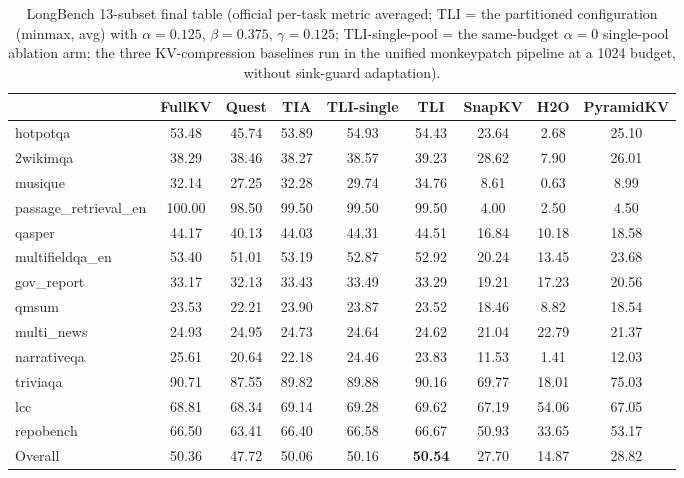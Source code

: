 \documentclass[11pt]{article}
\begin{document}
\begin{table}[h]\centering
\small
\caption{LongBench 13-subset final table (official per-task metric averaged; TLI = the partitioned configuration (minmax, avg) with $\alpha{=}0.125$, $\beta{=}0.375$, $\gamma{=}0.125$; TLI-single-pool = the same-budget $\alpha{=}0$ single-pool ablation arm; the three KV-compression baselines run in the unified monkeypatch pipeline at a 1024 budget, without sink-guard adaptation).}
\label{tab:longbench}
\begin{tabular}{lcccccccc}
\toprule
 & FullKV & Quest & TIA & TLI-single & TLI & SnapKV & H2O & PyramidKV \\

\midrule
hotpotqa & 53.48 & 45.74 & 53.89 & 54.93 & 54.43 & 23.64 & 2.68 & 25.10 \\
2wikimqa & 38.29 & 38.46 & 38.27 & 38.57 & 39.23 & 28.62 & 7.90 & 26.01 \\
musique & 32.14 & 27.25 & 32.28 & 29.74 & 34.76 & 8.61 & 0.63 & 8.99 \\
passage\_retrieval\_en & 100.00 & 98.50 & 99.50 & 99.50 & 99.50 & 4.00 & 2.50 & 4.50 \\
qasper & 44.17 & 40.13 & 44.03 & 44.31 & 44.51 & 16.84 & 10.18 & 18.58 \\
multifieldqa\_en & 53.40 & 51.01 & 53.19 & 52.87 & 52.92 & 20.24 & 13.45 & 23.68 \\
gov\_report & 33.17 & 32.13 & 33.43 & 33.49 & 33.29 & 19.21 & 17.23 & 20.56 \\
qmsum & 23.53 & 22.21 & 23.90 & 23.87 & 23.52 & 18.46 & 8.82 & 18.54 \\
multi\_news & 24.93 & 24.95 & 24.73 & 24.64 & 24.62 & 21.04 & 22.79 & 21.37 \\
narrativeqa & 25.61 & 20.64 & 22.18 & 24.46 & 23.83 & 11.53 & 1.41 & 12.03 \\
triviaqa & 90.71 & 87.55 & 89.82 & 89.88 & 90.16 & 69.77 & 18.01 & 75.03 \\
lcc & 68.81 & 68.34 & 69.14 & 69.28 & 69.62 & 67.19 & 54.06 & 67.05 \\
repobench & 66.50 & 63.41 & 66.40 & 66.58 & 66.67 & 50.93 & 33.65 & 53.17 \\
Overall & 50.36 & 47.72 & 50.06 & 50.16 & \textbf{50.54} & 27.70 & 14.87 & 28.82 \\
\bottomrule
\end{tabular}
\end{table}
\end{document}
